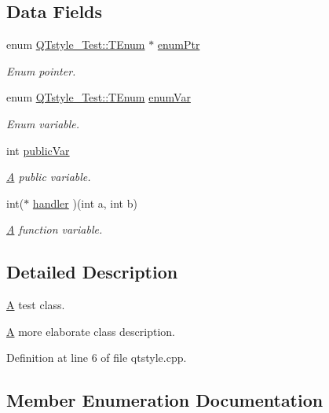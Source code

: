 \subsection*{Data Fields}
\begin{DoxyCompactItemize}
\item 
enum \hyperlink{class_q_tstyle___test_a33e3643b66dfa91e4fb7cc663a23e166}{Q\+Tstyle\+\_\+\+Test\+::\+T\+Enum} $\ast$ \hyperlink{class_q_tstyle___test_ab4ffc353b47d656f895ed0fabb3037f1}{enum\+Ptr}
\begin{DoxyCompactList}\small\item\em Enum pointer. \end{DoxyCompactList}\item 
enum \hyperlink{class_q_tstyle___test_a33e3643b66dfa91e4fb7cc663a23e166}{Q\+Tstyle\+\_\+\+Test\+::\+T\+Enum} \hyperlink{class_q_tstyle___test_a4a746447ffdce1c671760d032b6352bd}{enum\+Var}
\begin{DoxyCompactList}\small\item\em Enum variable. \end{DoxyCompactList}\item 
int \hyperlink{class_q_tstyle___test_a292887ac25652b1d8448430f583378c3}{public\+Var}
\begin{DoxyCompactList}\small\item\em \hyperlink{class_a}{A} public variable. \end{DoxyCompactList}\item 
int($\ast$ \hyperlink{class_q_tstyle___test_a83e6d7b763dc413e96b0c435a1d29a5d}{handler} )(int a, int b)
\begin{DoxyCompactList}\small\item\em \hyperlink{class_a}{A} function variable. \end{DoxyCompactList}\end{DoxyCompactItemize}


\subsection{Detailed Description}
\hyperlink{class_a}{A} test class. 

\hyperlink{class_a}{A} more elaborate class description. 

Definition at line 6 of file qtstyle.\+cpp.



\subsection{Member Enumeration Documentation}
\mbox{\label{class_q_tstyle___test_a33e3643b66dfa91e4fb7cc663a23e166}} 

